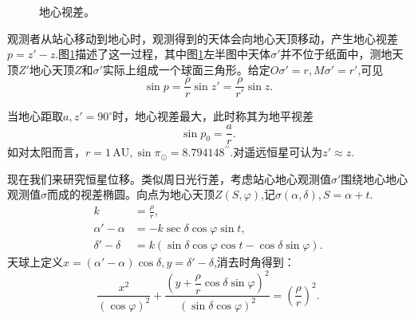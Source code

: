 \documentclass[11pt, a4paper, oneside]{ctexart}
\numberwithin{equation}{subsection}
\begin{document}
\begin{figure}[!htbp]
\begin{minipage}[t]{0.45\textwidth}
\end{minipage}
\begin{minipage}[t]{0.45\textwidth}
\end{minipage}
\captionsetup{justification=raggedright, singlelinecheck=false}
\caption{地心视差。}
\label{地心视差。}
\end{figure}

观测者从站心移动到地心时，观测得到的天体会向地心天顶移动，产生地心视差$p=z'-z$.图\ref{地心视差。}描述了这一过程，其中图\ref{地心视差。}左半图中天体$\sigma'$并不位于纸面中，测地天顶$Z'$地心天顶$Z$和$\sigma'$实际上组成一个球面三角形。给定$O\sigma'=r,M\sigma'=r'$,可见
\begin{equation}
\sin p=\frac{\rho}{r}\sin z'=\frac{\rho}{r'}\sin z.
\end{equation}

当地心距取$a,z'=90^{\circ}$时，地心视差最大，此时称其为地平视差
\begin{equation}
\sin p_{0}=\frac{a}{r}.
\end{equation}
如对太阳而言，$r=1\,\mathrm{AU},\sin\pi_{\odot}=8.794148^{\prime\prime}$.对遥远恒星可认为$z'\approx z$.

现在我们来研究恒星位移。类似周日光行差，考虑站心地心观测值$\sigma'$围绕地心地心观测值$\sigma$而成的视差椭圆。向点为地心天顶$Z\left(S,\varphi\right)$,记$\sigma\left(\alpha,\delta{}\right),S=\alpha+t$.
\begin{align}
k&=\frac{\rho}{r},\\
\alpha'-\alpha&=-k\sec\delta\cos\varphi\sin t,\\
\delta'-\delta&=k\left(\sin\delta\cos\varphi\cos t-\cos\delta\sin\varphi\right).
\end{align}
天球上定义$x=\left(\alpha'-\alpha\right)\cos\delta,y=\delta'-\delta$,消去时角得到：
\begin{equation}
\frac{x^2}{\left(\cos\varphi\right)^2}+\frac{\left(y+\dfrac{\rho}{r}\cos\delta\sin\varphi\right)^2}{\left(\sin\delta\cos\varphi\right)^2}=\left(\frac{\rho}{r}\right)^{2}.
\end{equation}
\end{document}
